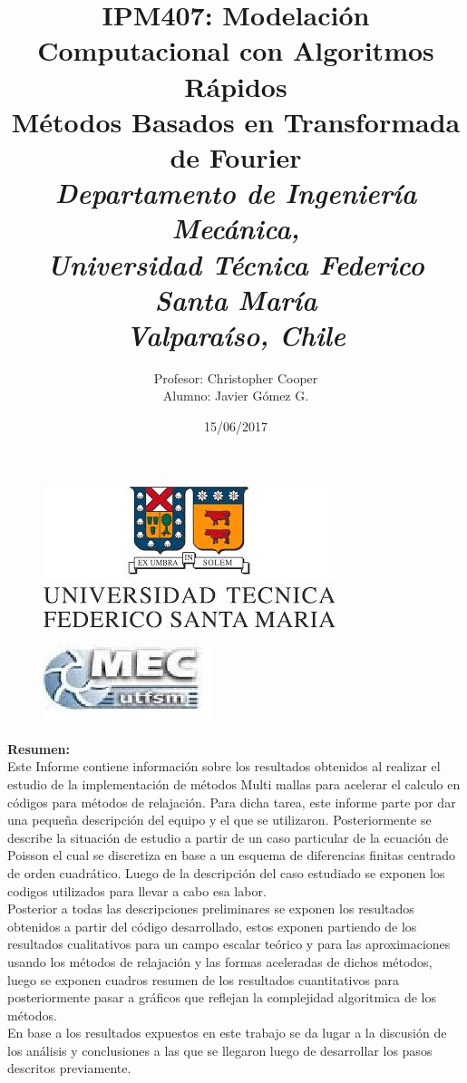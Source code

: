 \documentclass[letter,10pt]{article}
\title{\bf IPM407: Modelación Computacional con Algoritmos Rápidos\\{\bf Métodos Basados en Transformada de Fourier}\\{\it Departamento de Ingeniería Mecánica,}\\{\it Universidad Técnica Federico Santa María\\Valparaíso, Chile}}
\author{Profesor: Christopher Cooper \\ Alumno: Javier Gómez G.}
\date{15/06/2017}
\begin{document}
\maketitle
\begin{minipage}{0.5\linewidth}
\begin{figure}[H]
\centering
\includegraphics[scale=0.5]{img/usm1.jpg}
\end{figure}
\end{minipage}
      \hspace{0.01\linewidth}
      \begin{minipage}{0.3\linewidth}
\begin{figure}[H]
\centering
\includegraphics[scale=0.8]{img/mecanica.jpg}
\end{figure}
\end{minipage}

\thispagestyle{empty}

\newpage

{\bf\Large Resumen:}\\

\indent Este Informe contiene información sobre los resultados obtenidos al realizar el estudio de la implementación de métodos Multi mallas para acelerar el calculo en códigos para métodos de relajación. Para dicha tarea, este informe parte por dar una pequeña descripción del equipo y el que se utilizaron. Posteriormente se describe la situación de estudio a partir de un caso particular de la ecuación de Poisson el cual se discretiza en base a un esquema de diferencias finitas centrado de orden cuadrático. Luego de la descripción del caso estudiado se exponen los codigos utilizados para llevar a cabo esa labor.\\
\indent Posterior a todas las descripciones preliminares se exponen los resultados obtenidos a partir del código desarrollado, estos exponen partiendo de los resultados cualitativos para un campo escalar teórico y para las aproximaciones usando los métodos de relajación y las formas aceleradas de dichos métodos, luego se exponen cuadros resumen de los resultados cuantitativos para posteriormente pasar a gráficos que reflejan la complejidad algoritmica de los métodos.\\
\indent En base a los resultados expuestos en este trabajo se da lugar a la discusión de los análisis y conclusiones a las que se llegaron luego de desarrollar los pasos descritos previamente.\\ 
\\
\end{document}
